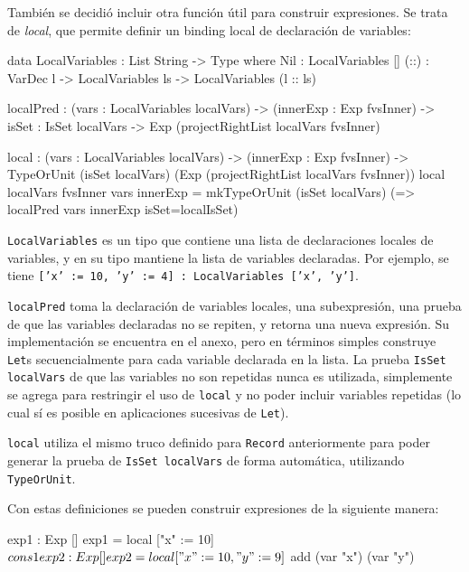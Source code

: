 También se decidió incluir otra función útil para construir expresiones. Se trata de \textit{local}, que permite definir un binding local de declaración de variables:

\begin{code}
data LocalVariables : List String -> Type where
  Nil : LocalVariables []
  (::) : VarDec l -> LocalVariables ls -> 
    LocalVariables (l :: ls) 

localPred : (vars : LocalVariables localVars) -> 
  (innerExp : Exp fvsInner) -> {isSet : IsSet localVars} -> 
  Exp (projectRightList localVars fvsInner)

local : (vars : LocalVariables localVars) -> 
  (innerExp : Exp fvsInner) -> 
  TypeOrUnit 
    (isSet localVars) 
    (Exp (projectRightList localVars fvsInner))
local {localVars} {fvsInner} vars innerExp = 
  mkTypeOrUnit (isSet localVars)
    (\localIsSet => localPred vars innerExp {isSet=localIsSet}) 
\end{code}

\texttt{LocalVariables} es un tipo que contiene una lista de declaraciones locales de variables, y en su tipo mantiene la lista de variables declaradas. Por ejemplo, se tiene \texttt{['x' := 10, 'y' := 4] : LocalVariables ['x', 'y']}.

\texttt{localPred} toma la declaración de variables locales, una subexpresión, una prueba de que las variables declaradas no se repiten, y retorna una nueva expresión. Su implementación se encuentra en el anexo, pero en términos simples construye \texttt{Let}s secuencialmente para cada variable declarada en la lista. La prueba \texttt{IsSet localVars} de que las variables no son repetidas nunca es utilizada, simplemente se agrega para restringir el uso de \texttt{local} y no poder incluir variables repetidas (lo cual sí es posible en aplicaciones sucesivas de \texttt{Let}).

\texttt{local} utiliza el mismo truco definido para \texttt{Record} anteriormente para poder generar la prueba de \texttt{IsSet localVars} de forma automática, utilizando \texttt{TypeOrUnit}.

Con estas definiciones se pueden construir expresiones de la siguiente manera:

\begin{code}
exp1 : Exp []
exp1 = local ["x" := 10] $ cons 1

exp2 : Exp []
exp2 = local ["x" := 10, "y" := 9] $ add (var "x") (var "y")
\end{code}

